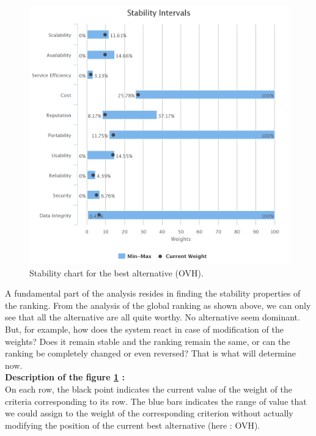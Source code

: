 \documentclass[a4paper,11pt]{article}
\begin{document}
\begin{figure}
  \centering
  \includegraphics[width=\textwidth-4cm]{img/Result/stability_chart.png}
  \caption{Stability chart for the best alternative (OVH).}
  \label{fig:stab}
\end{figure}

A fundamental part of the analysis resides in finding the stability properties of the ranking. From the analysis of the global ranking as shown above, we can only see that all the alternative are all quite worthy. No alternative seem dominant. But, for example, how does the system react in case of modification of the weights? Does it remain stable and the ranking remain the same, or can the ranking be completely changed or even reversed? That is what will determine now.\\

\textbf{Description of the figure \ref{fig:stab} :}\\

On each row, the black point indicates the current value of the weight of the criteria corresponding to its row. The blue bars indicates the range of value that we could assign to the weight of the corresponding criterion without actually modifying the position of the current best alternative (here : OVH). \\
\end{document}

